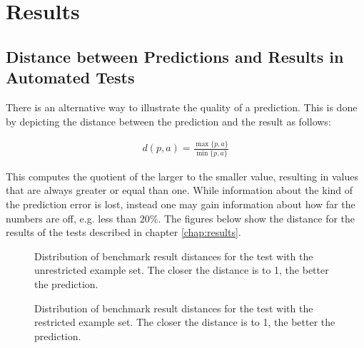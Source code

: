 \newpage



\section{Results}
\subsection{Distance between Predictions and Results in Automated Tests}
There is an alternative way to illustrate the quality of a prediction. This is done by depicting the distance between the prediction and the result as follows:

\begin{gather}
d(p,a) = \frac{\operatorname{max}\{p, a\}}{\operatorname{min}\{p,a\}}
\end{gather}

This computes the quotient of the larger to the smaller value, resulting in values that are always greater or equal than one. While information about the kind of the prediction error is lost, instead one may gain information about how far the numbers are off, e.g. less than $20\%$. The figures below show the distance for the results of the tests described in chapter \ref{chap:results}. \\

\begin{figure}[h]
	\begin{center}
	\end{center}
	\caption{Distribution of benchmark result distances for the test with the unrestricted example set. The closer the distance is to 1, the better the prediction.}
	\label{fig:appendix_diagrams_distance_random}
\end{figure}

\begin{figure}[h]
	\begin{center}
	\end{center}
	\caption{Distribution of benchmark result distances for the test with the restricted example set. The closer the distance is to 1, the better the prediction.}
	\label{fig:appendix_diagrams_distance_realistic}
\end{figure}
